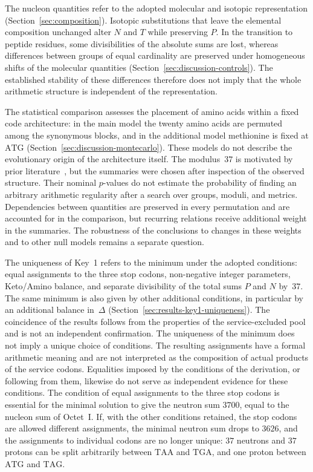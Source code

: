 \documentclass[11pt,a4paper]{article}
\renewcommand{\_}{\origunderscore\allowbreak}
\begin{document}
The nucleon quantities refer to the adopted molecular
and isotopic representation (Section~\ref{sec:composition}).
Isotopic substitutions that leave the elemental composition
unchanged alter $N$ and $T$ while preserving $P$. In the
transition to peptide residues, some divisibilities of the
absolute sums are lost, whereas differences between groups
of equal cardinality are preserved under homogeneous shifts
of the molecular quantities (Section~\ref{sec:discussion-controls}).
The established stability of these differences therefore does
not imply that the whole arithmetic structure is independent
of the representation.

The statistical comparison assesses the placement of amino
acids within a fixed code architecture: in the main model the
twenty amino acids are permuted among the synonymous blocks,
and in the additional model methionine is fixed at $\mathrm{ATG}$
(Section~\ref{sec:discussion-montecarlo}). These models
do not describe the evolutionary origin of the architecture
itself. The modulus~$37$ is motivated by prior literature~\cite{shcherbak1993,shcherbak2003,makukov2013,panov2024},
but the summaries were chosen after inspection of the observed
structure. Their nominal $p$-values do not estimate the
probability of finding an arbitrary arithmetic regularity after
a search over groups, moduli, and metrics. Dependencies between
quantities are preserved in every permutation and are accounted
for in the comparison, but recurring relations receive
additional weight in the summaries. The robustness of the
conclusions to changes in these weights and to other null
models remains a separate question.

The uniqueness of Key~1 refers to the minimum under the
adopted conditions: equal assignments to the three stop codons,
non-negative integer parameters, Keto/Amino balance, and
separate divisibility of the total sums $P$ and $N$ by~$37$.
The same minimum is also given by other additional conditions,
in particular by an additional balance in~$\Delta$
(Section~\ref{sec:results-key1-uniqueness}). The coincidence of
the results follows from the properties of the service-excluded
pool and is not an independent confirmation. The uniqueness of
the minimum does not imply a unique choice of conditions. The
resulting assignments have a formal arithmetic meaning and are
not interpreted as the composition of actual products of the
service codons. Equalities imposed by the conditions of the
derivation, or following from them, likewise do not serve as
independent evidence for these conditions. The condition of equal
assignments to the three stop codons is essential for the minimal
solution to give the neutron sum $3700$, equal to the nucleon sum of
Octet~I. If, with the other conditions retained, the stop codons are
allowed different assignments, the minimal neutron sum drops to
$3626$, and the assignments to individual codons are no longer unique:
$37$ neutrons and $37$ protons can be split arbitrarily between
$\mathrm{TAA}$ and $\mathrm{TGA}$, and one proton between
$\mathrm{ATG}$ and $\mathrm{TAG}$.
\end{document}

